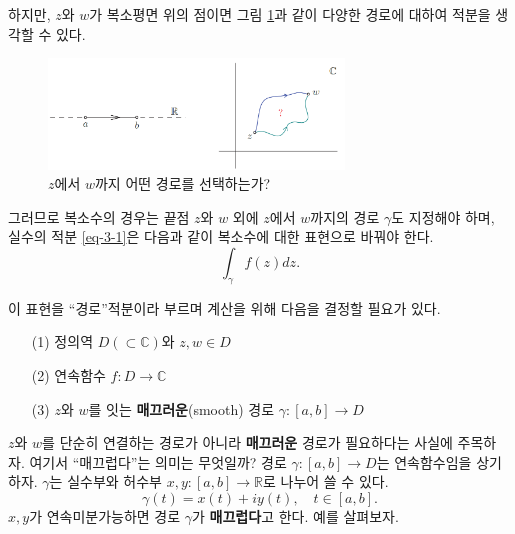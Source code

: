 하지만, $z$와 $w$가 복소평면 위의 점이면
그림 \ref{fig-3-1}과 같이 다양한 경로에 대하여 적분을 생각할 수 있다.

\begin{figure}[!h]
\begin{center}
\includegraphics[width=0.7\textwidth]{./SaltChapter/figs/fig-3-1}
\end{center}
\caption{$z$에서 $w$까지 어떤 경로를 선택하는가?}
\label{fig-3-1}
\end{figure}

그러므로 복소수의 경우는 끝점 $z$와 $w$ 외에
$z$에서 $w$까지의 경로 $\gamma$도 지정해야 하며,
실수의 적분 \eqref{eq-3-1}은
다음과 같이 복소수에 대한 표현으로 바꿔야 한다.
\[
\int_\gamma f(z)dz.
\]

이 표현을 ``경로''적분이라 부르며
계산을 위해 다음을 결정할 필요가 있다.
\begin{itemize}
\setlength\itemsep{0pt}
\item[(1)] 정의역  $D(\subset \mathbb C)$와 $z, w\in D$
\item[(2)] 연속함수 $f:D\to \mathbb C$
\item[(3)] $z$와 $w$를 잇는 {\bf 매끄러운}(smooth) 경로 $\gamma: [a,b] \to D$
\end{itemize}

$z$와 $w$를 단순히 연결하는 경로가 아니라  {\bf 매끄러운} 경로가
필요하다는 사실에 주목하자.
여기서 ``매끄럽다''는 의미는 무엇일까?
경로 $\gamma : [a,b] \to D$는 연속함수임을 상기하자.
$\gamma$는 실수부와 허수부 $x,y: [a,b] \to \mathbb R$로 나누어  쓸 수 있다.
\[
\gamma(t) = x(t) + iy(t), \quad t\in [a,b].
\]
$x, y$가 연속미분가능하면
경로 $\gamma$가 {\bf 매끄럽다}고 한다.
예를 살펴보자.


